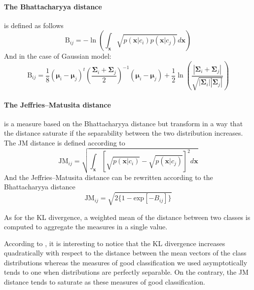\documentclass[a4paper,11pt,DIV=16]{scrartcl}
\begin{document}
        \paragraph{The Bhattacharyya distance} is defined as follows
        \begin{equation}
            \text{B}_{ij} = - \ln \left( \int_\mathbf{x} \sqrt{p(\mathbf{x}|c_i) p(\mathbf{x}|c_j)} d\mathbf{x} \right)
        \end{equation}
        And in the case of Gaussian model:
        \begin{equation}
            \text{B}_{ij} = \frac{1}{8} (\boldsymbol{\mu}_i - \boldsymbol{\mu}_j)^t \left( \frac{\boldsymbol{\Sigma}_i + \boldsymbol{\Sigma}_j}{2} \right)^{-1} (\boldsymbol{\mu}_i - \boldsymbol{\mu}_j) + \frac{1}{2} \ln \left( \frac{|\boldsymbol{\Sigma}_i + \boldsymbol{\Sigma}_j|}{\sqrt{|\boldsymbol{\Sigma}_i| |\boldsymbol{\Sigma}_j|}} \right)
        \end{equation}

        \paragraph{The Jeffries–Matusita distance} is a measure based on the Bhattacharyya distance but transform in a way that the distance saturate if the separability between the two distribution increases. The JM distance is defined according to
        \begin{equation}
            \text{JM}_{ij} = \sqrt{ \int_\mathbf{x} \left[\sqrt{p(\mathbf{x}|c_i)} - \sqrt{p(\mathbf{x}|c_j)}\right]^2 d\mathbf{x} }
        \end{equation}
        And the Jeffries–Matusita distance can be rewritten according to the Bhattacharyya distance
        \begin{equation}
            \text{JM}_{ij} = \sqrt{ 2 \{1 - \text{exp}[-B_{ij}]\} }
        \end{equation}

        As for the KL divergence, a weighted mean of the distance between two classes is computed to aggregate the measures in a single value.

        \vspace{10 mm}

        According to \cite{bruzzone2009novel}, it is interesting to notice that the KL divergence increases quadratically with respect to the distance between the mean vectors of the class distributions whereas the measures of good classification we used asymptotically tends to one when distributions are perfectly separable. On the contrary, the JM distance tends to saturate as these measures of good classification.
\end{document}
